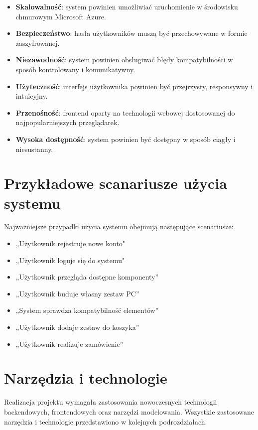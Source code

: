 \documentclass[a4paper,twoside,12pt]{book}
\begin{document}
\begin{itemize}
    \item \textbf{Skalowalność}: system powinien umożliwiać uruchomienie w środowisku chmurowym Microsoft Azure.
    \item \textbf{Bezpieczeństwo}: hasła użytkowników muszą być przechowywane w formie zaszyfrowanej.
    \item \textbf{Niezawodność}: system powinien obsługiwać błędy kompatybilności w sposób kontrolowany i komunikatywny.
    \item \textbf{Użyteczność}: interfejs użytkownika powinien być przejrzysty, responsywny i intuicyjny.
    \item \textbf{Przenośność}:  frontend oparty na technologii webowej dostosowanej do najpopularniejszych przeglądarek.
    \item \textbf{Wysoka dostępność}: system powinien być dostępny w sposób ciągły i niesustanny.
\end{itemize}

\section{Przykładowe scanariusze użycia systemu}

Najważniejsze przypadki użycia systemu obejmują następujące scenariusze:

\begin{itemize}
    \item „Użytkownik rejestruje nowe konto"
    \item „Użytkownik loguje się do systemu"
    \item „Użytkownik przegląda dostępne komponenty”
    \item „Użytkownik buduje własny zestaw PC”
    \item „System sprawdza kompatybilność elementów”
    \item „Użytkownik dodaje zestaw do koszyka”
    \item „Użytkownik realizuje zamówienie”
\end{itemize}


\newpage
\section{Narzędzia i technologie}

Realizacja projektu wymagała zastosowania nowoczesnych technologii backendowych, frontendowych oraz narzędzi modelowania. Wszystkie zastosowane narzędzia i technologie przedstawiono w kolejnych podrozdziałach.
\end{document}
